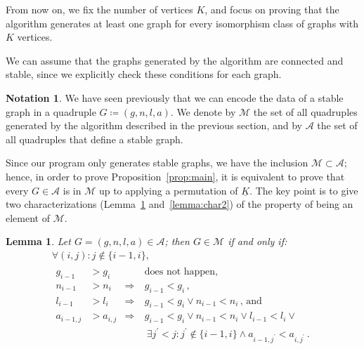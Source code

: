 \documentclass{amsart}
\theoremstyle{plain}
\newtheorem{lemma}[theorem]{Lemma}
\theoremstyle{definition}
\newtheorem{notation}[theorem]{Notation}
\newcommand{\ubar}[1]{\underline{#1}}
\begin{document}
From now on, we fix the number of vertices $K$, and focus on proving
that the algorithm generates at least one graph for every isomorphism
class of graphs with $K$ vertices.

We can assume that the graphs generated by the algorithm are connected
and stable, since we explicitly check these conditions for each graph.


\begin{notation}
  We have seen previously that we can encode the data of a stable
  graph in a quadruple $G \coloneqq (g, n, l, a)$. We denote by
  $\mathcal{M}$ the set of all quadruples generated by the algorithm
  described in the previous section, and by $\mathcal{A}$ the set of
  all quadruples that define a stable graph.
\end{notation}

Since our program only generates stable graphs, we have
the inclusion $\mathcal{M} \subset \mathcal{A}$; hence, in order to prove
Proposition~\ref{prop:main}, it is equivalent to prove that every $G \in
\mathcal{A}$ is in $\mathcal{M}$ up to applying a permutation of
$\ubar{K}$. The key point is to give two characterizations
(Lemma~\ref{lemma:char1} and~\ref{lemma:char2}) of the property of
being an element of $\mathcal{M}$.

\begin{lemma}\label{lemma:char1}
  Let $G = (g, n, l, a) \in \mathcal{A}$; then $G \in \mathcal{M}$ if
  and only if:
  \begin{multline*}
    \forall (i,j)\colon
    j \not\in \{i-1, i\},\\
    \begin{aligned}
      g_{i-1} &> g_i &&\text{does not happen,}\\
      n_{i-1} &> n_i &\Rightarrow\  & g_{i-1} < g_i\,\text{,}\\
      l_{i-1} &> l_i &\Rightarrow\  & g_{i-1} < g_i \vee n_{i-1} < n_i\,\text{, and}\\
      a_{i-1,j} &> a_{i,j} &\Rightarrow\ & g_{i-1} < g_i \vee n_{i-1}
      < n_i \vee l_{i-1} < l_i \vee\\
      &&&\ \exists j^\prime < j: j^\prime \not\in \{i-1,i\} \wedge
      a_{i-1,j^\prime} < a_{i,j^\prime}\,\text{.}
    \end{aligned}
  \end{multline*}
\end{lemma}
\end{document}
